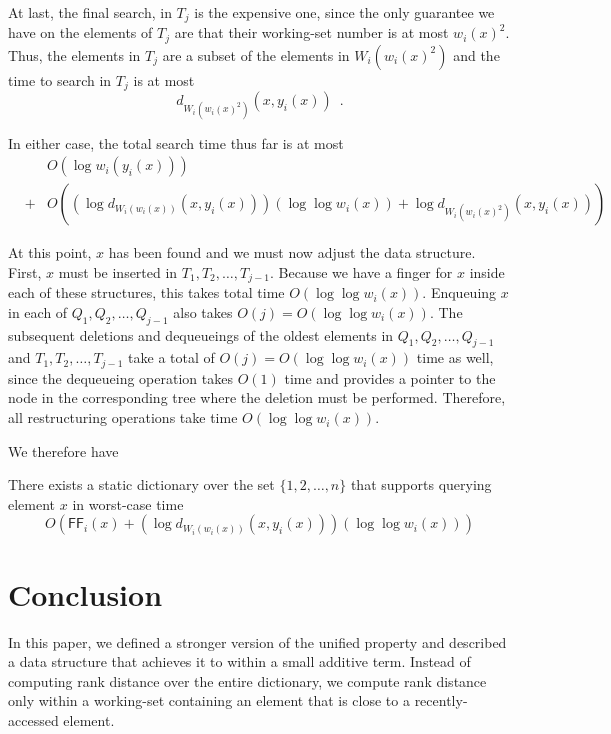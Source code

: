 \documentclass{llncs}
\newcommand{\BigOh}[1]{O\!\left(#1\right)}
\newcommand{\SU}[1]{\textsf{FF}_i\!\left(#1\right)}
\newcommand{\pat}[1]{\textcolor{red}{(PM Says: #1)}}
\begin{document}


At last, the final search, in $T_j$ is the expensive one, since the only
guarantee we have on the elements of $T_j$ are that their working-set number
is at most $w_i(x)^2$.  Thus, the elements in $T_j$ are a subset of the elements in $W_i(w_i(x)^2)$ and the time to search in $T_j$ is at most
\[
    d_{W_i(w_i(x)^2)}(x,y_i(x)) \enspace .
\]

In either case, the total search time thus far is at most 
\begin{eqnarray*}
&&\BigOh{\log w_i(y_i(x))}\\&+& \BigOh{(\log d_{W_i(w_i(x))}(x,y_i(x)))(\log \log w_i(x)) + \log d_{W_i(w_i(x)^2)}(x,y_i(x))}
\end{eqnarray*}

At this point, $x$ has been found and we must now adjust the data structure. First, $x$ must be inserted in $T_1,T_2,\ldots,T_{j-1}$. Because we have a finger for $x$ inside each of these structures, this takes total time $\BigOh{\log \log w_i(x)}$. Enqueuing $x$ in each of $Q_1,Q_2,\ldots,Q_{j-1}$ also takes $\BigOh{j} = \BigOh{\log \log w_i(x)}$. The subsequent deletions and dequeueings of the oldest elements in $Q_1,Q_2,\ldots,Q_{j-1}$ and $T_1,T_2,\ldots,T_{j-1}$ take a total of $\BigOh{j} = \BigOh{\log \log w_i(x)}$ time as well, since the dequeueing operation takes $\BigOh{1}$ time and provides a pointer to the node in the corresponding tree where the deletion must be performed. Therefore, all restructuring operations take time $\BigOh{\log \log w_i(x)}$.

We therefore have

\begin{theorem}
\label{theorem:main}
There exists a static dictionary over the set $\{1,2,\ldots,n\}$ that supports querying element $x$ in worst-case time
\begin{displaymath}
\BigOh{\SU{x} + (\log d_{W_i(w_i(x))}(x,y_i(x)))(\log \log w_i(x))}
\end{displaymath}
\end{theorem}
	
\section{Conclusion}
\label{section:conclusion}

In this paper, we defined a stronger version of the unified property and described a data structure that achieves it to within a small additive term. Instead of computing rank distance over the entire dictionary, we compute rank distance only within a working-set containing an element that is close to a recently-accessed element.
\end{document}
